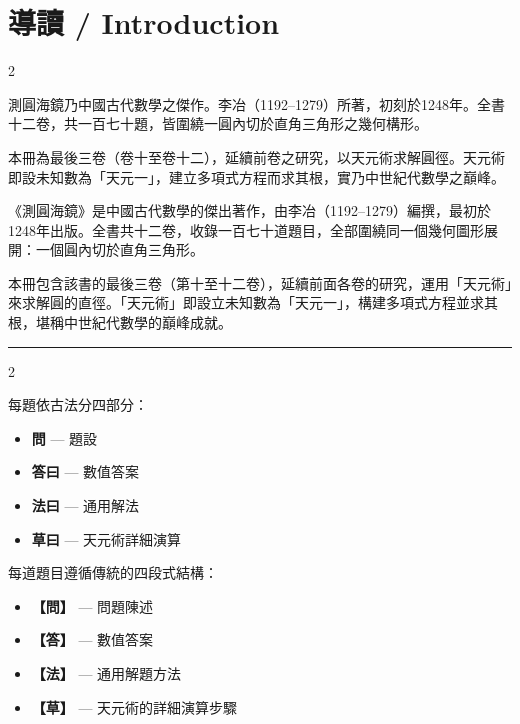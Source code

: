 \documentclass[11pt,a4paper]{article}
\newcommand{\longline}{\noindent\rule{\textwidth}{0.4pt}}
\begin{document}
\section*{導讀 / Introduction}

\begin{paracol}{2}

測圓海鏡乃中國古代數學之傑作。李冶（1192–1279）所著，初刻於1248年。全書十二卷，共一百七十題，皆圍繞一圓內切於直角三角形之幾何構形。

本冊為最後三卷（卷十至卷十二），延續前卷之研究，以天元術求解圓徑。天元術即設未知數為「天元一」，建立多項式方程而求其根，實乃中世紀代數學之巔峰。

\switchcolumn

《測圓海鏡》是中國古代數學的傑出著作，由李冶（1192–1279）編撰，最初於1248年出版。全書共十二卷，收錄一百七十道題目，全部圍繞同一個幾何圖形展開：一個圓內切於直角三角形。

本冊包含該書的最後三卷（第十至十二卷），延續前面各卷的研究，運用「天元術」來求解圓的直徑。「天元術」即設立未知數為「天元一」，構建多項式方程並求其根，堪稱中世紀代數學的巔峰成就。

\end{paracol}

\vspace{0.5cm}
\longline

\begin{paracol}{2}

每題依古法分四部分：
\begin{itemize}[leftmargin=1.5em]
  \item \textbf{問} — 題設
  \item \textbf{答曰} — 數值答案
  \item \textbf{法曰} — 通用解法
  \item \textbf{草曰} — 天元術詳細演算
\end{itemize}

\switchcolumn

每道題目遵循傳統的四段式結構：
\begin{itemize}[leftmargin=1.5em]
  \item \textbf{【問】} — 問題陳述
  \item \textbf{【答】} — 數值答案
  \item \textbf{【法】} — 通用解題方法
  \item \textbf{【草】} — 天元術的詳細演算步驟
\end{itemize}

\end{paracol}
\end{document}
